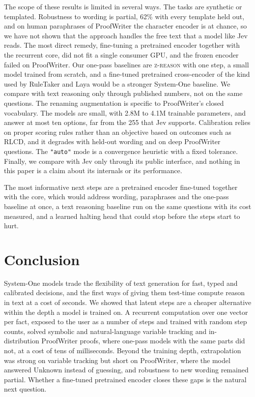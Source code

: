 \documentclass{article}
\newcommand{\zr}{\textsc{z-reason}}
\begin{document}
The scope of these results is limited in several ways. The tasks are synthetic or templated. Robustness to wording is partial, 62\% with every template held out, and on human paraphrases of ProofWriter the character encoder is at chance, so we have not shown that the approach handles the free text that a model like Jev reads. The most direct remedy, fine-tuning a pretrained encoder together with the recurrent core, did not fit a single consumer GPU, and the frozen encoder failed on ProofWriter. Our one-pass baselines are \zr{} with one step, a small model trained from scratch, and a fine-tuned pretrained cross-encoder of the kind used by RuleTaker and Laya would be a stronger System-One baseline. We compare with text reasoning only through published numbers, not on the same questions. The renaming augmentation is specific to ProofWriter's closed vocabulary. The models are small, with 2.8M to 4.1M trainable parameters, and answer at most ten options, far from the 255 that Jev supports. Calibration relies on proper scoring rules rather than an objective based on outcomes such as RLCD, and it degrades with held-out wording and on deep ProofWriter questions. The \texttt{"auto"} mode is a convergence heuristic with a fixed tolerance. Finally, we compare with Jev only through its public interface, and nothing in this paper is a claim about its internals or its performance.

The most informative next steps are a pretrained encoder fine-tuned together with the core, which would address wording, paraphrases and the one-pass baseline at once, a text reasoning baseline run on the same questions with its cost measured, and a learned halting head that could stop before the steps start to hurt.

\section{Conclusion}
\label{sec:conclusion}

System-One models trade the flexibility of text generation for fast, typed and calibrated decisions, and the first ways of giving them test-time compute reason in text at a cost of seconds. We showed that latent steps are a cheaper alternative within the depth a model is trained on. A recurrent computation over one vector per fact, exposed to the user as a number of steps and trained with random step counts, solved symbolic and natural-language variable tracking and in-distribution ProofWriter proofs, where one-pass models with the same parts did not, at a cost of tens of milliseconds. Beyond the training depth, extrapolation was strong on variable tracking but short on ProofWriter, where the model answered Unknown instead of guessing, and robustness to new wording remained partial. Whether a fine-tuned pretrained encoder closes these gaps is the natural next question.
\end{document}

